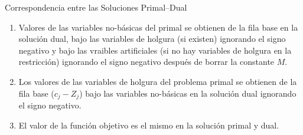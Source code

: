 \begin{frame}{Correspondencia entre las Soluciones Primal--Dual}

  \begin{enumerate} \justifying \parskip3mm
  \item Valores de las variables no-básicas del primal se obtienen de la fila base en la solución dual, bajo las variables de holgura (si existen) ignorando el signo negativo y bajo las vraibles artificiales (si no hay variables de holgura en la restricción) ignorando el signo negativo después de borrar la constante $M$.
  \item Los valores de las variables de holgura del problema primal se obtienen de la fila base ($c_j - Z_j$) bajo las variables no-básicas en la solución dual ignorando el signo negativo.
  \item El valor de la función objetivo es el mismo en la solución primal y dual.
  \end{enumerate}
\end{frame}



